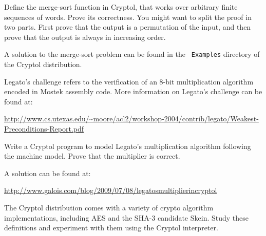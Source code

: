 \begin{Exercise}\label{ex:misc:sort}
  Define the merge-sort function in Cryptol, that works over arbitrary
  finite sequences of words. Prove its correctness. You might want to
  split the proof in two parts. First prove that the output is a
  permutation of the input, and then prove that the output is always
  in increasing order.
\end{Exercise}
\begin{Answer}
  A solution to the merge-sort problem can be found in the {\tt
    Examples} directory of the Cryptol distribution.
\end{Answer}

\begin{Exercise}\label{ex:misc:legato}
  Legato's challenge refers to the verification of an 8-bit
  multiplication algorithm encoded in Mostek assembly code. More
  information on Legato's challenge can be found at:
\begin{center}
 \url{http://www.cs.utexas.edu/~moore/acl2/workshop-2004/contrib/legato/Weakest-Preconditions-Report.pdf}
\end{center}
Write a Cryptol program to model Legato's multiplication algorithm
following the machine model. Prove that the multiplier is correct.
\end{Exercise}
\begin{Answer}
A solution can be found at:
\begin{center} \url{http://www.galois.com/blog/2009/07/08/legatosmultiplierincryptol}
\end{center}
\end{Answer}

\begin{Exercise}\label{ex:misc:skein}
  The Cryptol distribution comes with a variety of crypto algorithm
  implementations, including AES and the SHA-3 candidate Skein.  Study
  these definitions and experiment with them using the Cryptol
  interpreter.
\end{Exercise}
